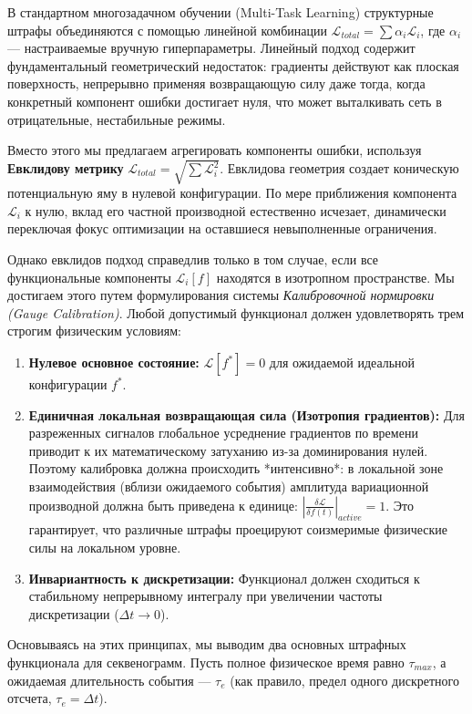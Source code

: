 \documentclass[11pt,a4paper]{article}
\begin{document}
В стандартном многозадачном обучении (Multi-Task Learning) структурные штрафы объединяются с помощью линейной комбинации $\mathcal{L}_{total} = \sum \alpha_i \mathcal{L}_i$, где $\alpha_i$ — настраиваемые вручную гиперпараметры. Линейный подход содержит фундаментальный геометрический недостаток: градиенты действуют как плоская поверхность, непрерывно применяя возвращающую силу даже тогда, когда конкретный компонент ошибки достигает нуля, что может выталкивать сеть в отрицательные, нестабильные режимы.

Вместо этого мы предлагаем агрегировать компоненты ошибки, используя \textbf{Евклидову метрику} $\mathcal{L}_{total} = \sqrt{\sum \mathcal{L}_i^2}$. Евклидова геометрия создает коническую потенциальную яму в нулевой конфигурации. По мере приближения компонента $\mathcal{L}_i$ к нулю, вклад его частной производной естественно исчезает, динамически переключая фокус оптимизации на оставшиеся невыполненные ограничения.

Однако евклидов подход справедлив только в том случае, если все функциональные компоненты $\mathcal{L}_i[f]$ находятся в изотропном пространстве. Мы достигаем этого путем формулирования системы \textit{Калибровочной нормировки (Gauge Calibration)}. Любой допустимый функционал должен удовлетворять трем строгим физическим условиям:
\begin{enumerate}
    \item \textbf{Нулевое основное состояние:} $\mathcal{L}[f^*] = 0$ для ожидаемой идеальной конфигурации $f^*$.
    \item \textbf{Единичная локальная возвращающая сила (Изотропия градиентов):} Для разреженных сигналов глобальное усреднение градиентов по времени приводит к их математическому затуханию из-за доминирования нулей. Поэтому калибровка должна происходить *интенсивно*: в локальной зоне взаимодействия (вблизи ожидаемого события) амплитуда вариационной производной должна быть приведена к единице: $\left| \frac{\delta \mathcal{L}}{\delta f(t)} \right|_{active} = 1$. Это гарантирует, что различные штрафы проецируют соизмеримые физические силы на локальном уровне.
    \item \textbf{Инвариантность к дискретизации:} Функционал должен сходиться к стабильному непрерывному интегралу при увеличении частоты дискретизации ($\Delta t \to 0$).
\end{enumerate}

Основываясь на этих принципах, мы выводим два основных штрафных функционала для секвенограмм. Пусть полное физическое время равно $\tau_{max}$, а ожидаемая длительность события — $\tau_e$ (как правило, предел одного дискретного отсчета, $\tau_e = \Delta t$).
\end{document}
